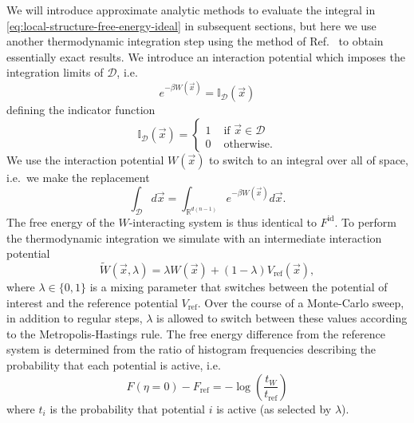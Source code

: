 \documentclass[11pt,twoside]{report}
\begin{document}
We will introduce approximate analytic methods to evaluate the integral in \eqref{eq:local-structure-free-energy-ideal} in subsequent sections, but here we use another thermodynamic integration step using the method of Ref.\ \cite{SchillingJCP2009} to obtain essentially exact results.
We introduce an interaction potential which imposes the integration limits of $\mathcal{D}$, i.e.\
\begin{equation*}
  e^{-\beta W(\vec{x})}
  =
  \mathbb{I}_\mathcal{D}(\vec{x})
\end{equation*}
defining the indicator function%
\begin{equation*}
  \mathbb{I}_{\mathcal{D}}(\vec{x})
  =
  \begin{cases}
    1 & \textrm{ if } \vec{x} \in \mathcal{D} \\
    0 & \textrm{ otherwise}.
  \end{cases}
\end{equation*}
We use the interaction potential $W(\vec{x})$ to switch to an integral over all of space, i.e.\ we make the replacement
\begin{equation*}
  \int_{\mathcal{D}} d\vec{x}
  =
  \int_{\mathbb{R}^{d(n-1)}} e^{-\beta W(\vec{x})} d\vec{x}.
\end{equation*}
The free energy of the $W$-interacting system is thus identical to $F^\mathrm{id}$.
To perform the thermodynamic integration we simulate with an intermediate interaction potential \cite{SchillingJCP2009}
\begin{equation*}
  \widetilde{W}(\vec{x}, \lambda)
  =
  \lambda W(\vec{x}) + (1-\lambda) V_\mathrm{ref}(\vec{x}),
\end{equation*}
where $\lambda \in \{0,1\}$ is a mixing parameter that switches between the potential of interest and the reference potential $V_\mathrm{ref}$.
Over the course of a Monte-Carlo sweep, in addition to regular steps, $\lambda$ is allowed to switch between these values according to the Metropolis-Hastings rule.
The free energy difference from the reference system is determined from the ratio of histogram frequencies describing the probability that each potential is active, i.e.\
\begin{equation}\label{eq:ideal-free-energy-change}
  F(\eta = 0) - F_\mathrm{ref}
  = -\log{\left( \frac{t_W}{t_\mathrm{ref}} \right)}
\end{equation}
where $t_i$ is the probability that potential $i$ is active (as selected by $\lambda$).
\end{document}
